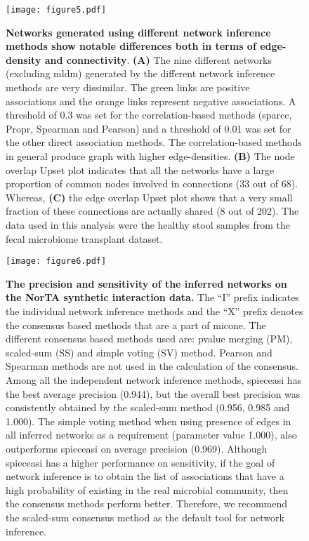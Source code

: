   \begin{figure}[H]
    \centering
    \texttt{[image: figure5.pdf]}
  \end{figure}
  \begin{figure}[H]
    \centering
    \caption{
      \textbf{Networks generated using different network inference methods show notable differences both in terms of edge-density and connectivity}.
      \textbf{(A)} The nine different networks (excluding \ac{mldm}) generated by the different network inference methods are very dissimilar.
      The green links are positive associations and the orange links represent negative associations.
      A threshold of 0.3 was set for the correlation-based methods (\ac{sparcc}, Propr, Spearman and Pearson) and a threshold of 0.01 was set for the other direct association methods.
      The correlation-based methods in general produce graph with higher edge-densities.
      \textbf{(B)} The node overlap Upset plot indicates that all the networks have a large proportion of common nodes involved in connections (33 out of 68).
      Whereas, \textbf{(C)} the edge overlap Upset plot shows that a very small fraction of these connections are actually shared (8 out of 202).
      The data used in this analysis were the healthy stool samples from the fecal microbiome transplant dataset.
    }
    \label{fig:figure5}
  \end{figure}
  \FloatBarrier
  \newpage

  \begin{figure}[H]
    \centering
    \texttt{[image: figure6.pdf]}
    \caption{
      \textbf{The precision and sensitivity of the inferred networks on the NorTA synthetic interaction data.}
      The ``I'' prefix indicates the individual network inference methods and the ``X'' prefix denotes the consensus based methods that are a part of \ac{micone}.
      The different consensus based methods used are: pvalue merging (PM), scaled-sum (SS) and simple voting (SV) method.
      Pearson and Spearman methods are not used in the calculation of the consensus.
      Among all the independent network inference methods, \ac{spieceasi} has the best average precision (0.944), but the overall best precision was consistently obtained by the scaled-sum method (0.956, 0.985 and 1.000).
      The simple voting method when using presence of edges in all inferred networks as a requirement (parameter value 1.000), also outperforms \ac{spieceasi} on average precision (0.969).
      Although \ac{spieceasi} has a higher performance on sensitivity, if the goal of network inference is to obtain the list of associations that have a high probability of existing in the real microbial community, then the consensus methods perform better.
      Therefore, we recommend the scaled-sum consensus method as the default tool for network inference.
    }
    \label{fig:figure6}
  \end{figure}
  \FloatBarrier
  \newpage

